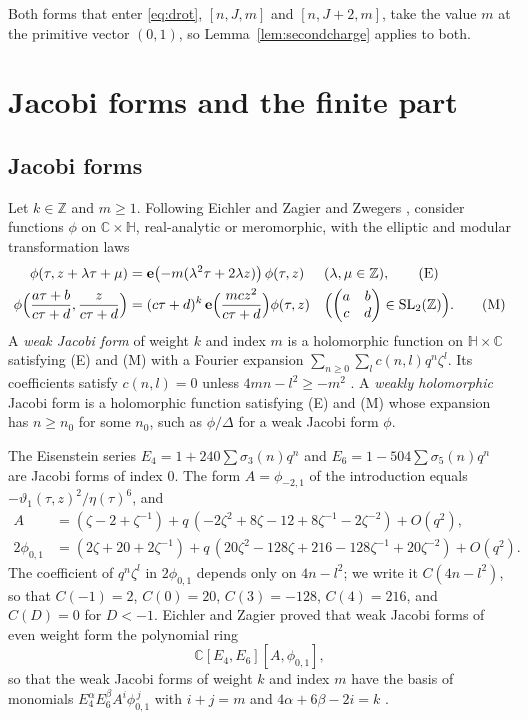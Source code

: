 \documentclass[11pt]{amsart}
\theoremstyle{definition}
\newcommand{\ZZ}{\mathbb{Z}}
\newcommand{\CC}{\mathbb{C}}
\newcommand{\HH}{\mathbb{H}}
\newcommand{\vt}{\vartheta}
\newcommand{\e}{\mathbf{e}}
\begin{document}
Both forms that enter \eqref{eq:drot}, $[n,J,m]$ and $[n,J+2,m]$, take the value $m$ at the primitive vector $(0,1)$, so Lemma~\ref{lem:secondcharge} applies to both.

\section{Jacobi forms and the finite part}\label{sec:jacobi}

\subsection{Jacobi forms}
Let $k\in\ZZ$ and $m\ge1$. Following Eichler and Zagier \cite{EZ85} and Zwegers \cite[Ch.~3]{Zwe02}, consider functions $\phi$ on $\CC\times\HH$, real-analytic or meromorphic, with the elliptic and modular transformation laws
\begin{align}
\phi(\tau,z+\lambda\tau+\mu)&=\e\bigl(-m(\lambda^2\tau+2\lambda z)\bigr)\,\phi(\tau,z)&&(\lambda,\mu\in\ZZ),\tag{E}\\
\phi\Bigl(\frac{a\tau+b}{c\tau+d},\frac{z}{c\tau+d}\Bigr)&=(c\tau+d)^k\,\e\Bigl(\frac{mcz^2}{c\tau+d}\Bigr)\phi(\tau,z)&&\Bigl(\begin{pmatrix}a&b\\c&d\end{pmatrix}\in\mathrm{SL}_2(\ZZ)\Bigr).\tag{M}
\end{align}
A \emph{weak Jacobi form} of weight $k$ and index $m$ is a holomorphic function on $\HH\times\CC$ satisfying (E) and (M) with a Fourier expansion $\sum_{n\ge0}\sum_{l}c(n,l)q^n\zeta^l$. Its coefficients satisfy $c(n,l)=0$ unless $4mn-l^2\ge-m^2$ \cite[\S9]{EZ85}. A \emph{weakly holomorphic} Jacobi form is a holomorphic function satisfying (E) and (M) whose expansion has $n\ge n_0$ for some $n_0$, such as $\phi/\Delta$ for a weak Jacobi form $\phi$.

The Eisenstein series $E_4=1+240\sum\sigma_3(n)q^n$ and $E_6=1-504\sum\sigma_5(n)q^n$ are Jacobi forms of index $0$. The form $A=\phi_{-2,1}$ of the introduction equals $-\vt_1(\tau,z)^2/\eta(\tau)^6$, and
\begin{align*}
A&=(\zeta-2+\zeta^{-1})+q\,(-2\zeta^2+8\zeta-12+8\zeta^{-1}-2\zeta^{-2})+O(q^2),\\
2\phi_{0,1}&=(2\zeta+20+2\zeta^{-1})+q\,(20\zeta^2-128\zeta+216-128\zeta^{-1}+20\zeta^{-2})+O(q^2).
\end{align*}
The coefficient of $q^n\zeta^l$ in $2\phi_{0,1}$ depends only on $4n-l^2$; we write it $C(4n-l^2)$, so that $C(-1)=2$, $C(0)=20$, $C(3)=-128$, $C(4)=216$, and $C(D)=0$ for $D<-1$. Eichler and Zagier proved that weak Jacobi forms of even weight form the polynomial ring
\begin{equation}\label{eq:ring}
\CC[E_4,E_6][A,\phi_{0,1}],
\end{equation}
so that the weak Jacobi forms of weight $k$ and index $m$ have the basis of monomials $E_4^\alpha E_6^\beta A^i\phi_{0,1}^{\,j}$ with $i+j=m$ and $4\alpha+6\beta-2i=k$ \cite[Thm.~9.3]{EZ85}.
\end{document}
